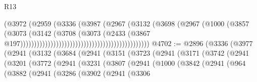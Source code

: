 \begin{lexlean}{R13}
\begin{coremodule}
                                                                  (@3972
                                                                    (@2959
                                                                      (@3336
                                                                        (@3987
                                                                          (@2967
                                                                            (@3132
                                                                              (@3698
                                                                                (@2967
                                                                                  (@1000
                                                                                    (@3857
                                                                                      (@3073
                                                                                        (@3142
                                                                                          (@3708
                                                                                            (@3073
                                                                                              (@2433
                                                                                                (@3867
                                                                                                  @197)))))))))))))))))))))))))))))))))))))))))))))))
@4702 := @2896
    (@3336
      (@3977
        (@2941
          (@3132
            (@3684
              (@2941
                (@3151
                  (@3723
                    (@2941
                      (@3171
                        (@3742
                          (@2941
                            (@3201
                              (@3772
                                (@2941
                                  (@3231
                                    (@3807
                                      (@2941
                                        (@1000
                                          (@3842
                                            (@2941
                                              (@964
                                                (@3882
                                                  (@2941
                                                    (@3286
                                                      (@3902
                                                        (@2941
                                                          (@3306

\end{coremodule}
\end{lexlean}
